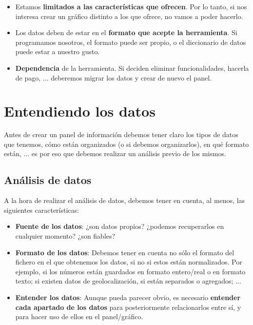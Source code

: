 \begin{itemize}
    \item Estamos \textbf{limitados a las características que ofrecen}. Por lo tanto, si nos interesa crear un gráfico distinto a los que ofrece, no vamos a poder hacerlo.

    \item Los datos deben de estar en el \textbf{formato que acepte la herramienta}. Si programamos nosotros, el formato puede ser propio, o el diccionario de datos puede estar a nuestro gusto.

    \item \textbf{Dependencia} de la herramienta. Si deciden eliminar funcionalidades, hacerla de pago, ... deberemos migrar los datos y crear de nuevo el panel.

\end{itemize}


\chapter{Entendiendo los datos}

Antes de crear un panel de información debemos tener claro los tipos de datos que tenemos, cómo están organizados (o si debemos organizarlos), en qué formato están, ... es por eso que debemos realizar un análisis previo de los mismos.

\section{Análisis de datos}

A la hora de realizar el análisis de datos, debemos tener en cuenta, al menos, las siguientes características:

\begin{itemize}
    \item \textbf{Fuente de los datos}: ¿son datos propios? ¿podemos recuperarlos en cualquier momento? ¿son fiables?

    \item \textbf{Formato de los datos}: Debemos tener en cuenta no sólo el formato del fichero en el que obtenemos los datos, si no si estos están normalizados. Por ejemplo, si los números están guardados en formato entero/real o en formato texto; si existen datos de geolocalización, si están separados o agregados; ...

    \item \textbf{Entender los datos}: Aunque pueda parecer obvio, es necesario \textbf{entender cada apartado de los datos} para posteriormente relacionarlos entre sí, y para hacer uso de ellos en el panel/gráfico.
\end{itemize}


